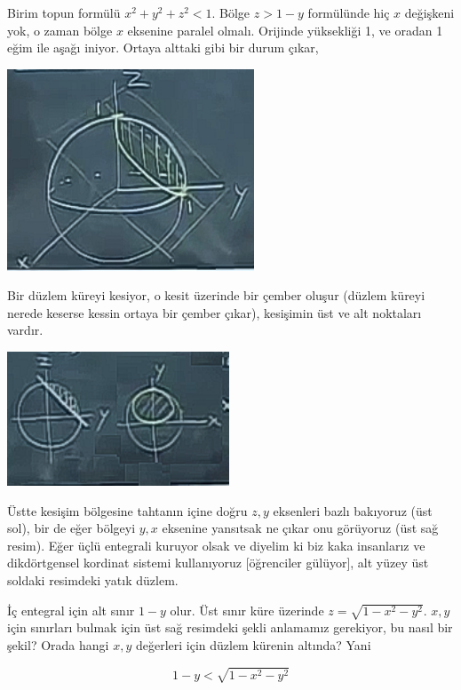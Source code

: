 \documentclass[12pt,fleqn]{article}\usepackage{../../common}
\begin{document}
Birim topun formülü $x^2 + y^2 + z^2 < 1$. Bölge $z > 1-y$ formülünde hiç
$x$ değişkeni yok, o zaman bölge $x$ eksenine paralel olmalı. Orijinde
yüksekliği 1, ve oradan 1 eğim ile aşağı iniyor. Ortaya alttaki gibi bir
durum çıkar,

\begin{center}
\includegraphics[height=6cm]{25_13.png}
\end{center}

Bir düzlem küreyi kesiyor, o kesit üzerinde bir çember oluşur (düzlem
küreyi nerede keserse kessin ortaya bir çember çıkar), kesişimin üst ve alt
noktaları vardır. 

\begin{center}
\includegraphics[height=4cm]{25_14.png}
\end{center}

Üstte kesişim bölgesine tahtanın içine doğru $z,y$ eksenleri bazlı
bakıyoruz (üst sol), bir de eğer bölgeyi $y,x$ eksenine yansıtsak ne çıkar
onu görüyoruz (üst sağ resim). Eğer üçlü entegrali kuruyor olsak ve diyelim
ki biz kaka insanlarız ve dikdörtgensel kordinat sistemi kullanıyoruz
[öğrenciler gülüyor], alt yüzey üst soldaki resimdeki yatık düzlem. 

İç entegral için alt sınır $1-y$ olur. Üst sınır küre üzerinde
$z = \sqrt{1-x^2-y^2}$. $x,y$ için sınırları bulmak için üst sağ resimdeki
şekli anlamamız gerekiyor, bu nasıl bir şekil? Orada hangi $x,y$ değerleri
için düzlem kürenin altında? Yani 

$$ 1-y < \sqrt{1-x^2-y^2} $$
\end{document}
